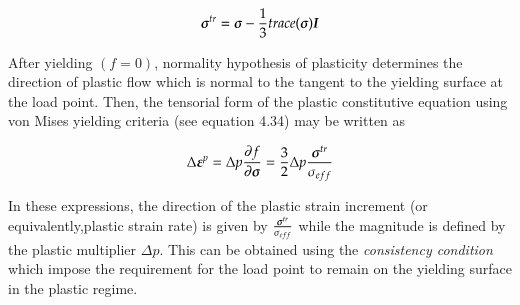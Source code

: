\begin{equation} \label{eqn:smm:constitutive:deviatoric stress}
	{\ensuremath{\boldsymbol{\sigma}}}^{tr}=\boldsymbol{\sigma} - \frac{1}{3} trace(\boldsymbol{\sigma}) \boldsymbol{I}
\end{equation} 

After yielding $(f = 0)$, normality hypothesis of plasticity determines the direction of plastic flow which is normal to the tangent to the yielding surface at the load point. Then, the tensorial form of the plastic constitutive equation using von Mises yielding criteria (see equation 4.34) may be written as

\begin{equation} \label{eqn:smm:constitutive:plastic contitutive equation}
	\Delta {\ensuremath{\boldsymbol{\varepsilon}}}^p = \Delta p \frac {\partial{f}}{\partial{\ensuremath{\boldsymbol{\sigma}}}}=\frac{3}{2} \Delta p \frac{{\boldsymbol{\sigma}}^{tr}}{\sigma_{eff}}
\end{equation}

In these expressions, the direction of the plastic strain increment (or equivalently,plastic strain rate) is given by $\frac{{\boldsymbol{\sigma}}^{tr}}{\sigma_{eff}}$ while the magnitude is defined by the plastic multiplier $\Delta p$. This can be obtained using the \textit{consistency condition} which impose the requirement for the load point to remain on the yielding surface in the plastic regime.

